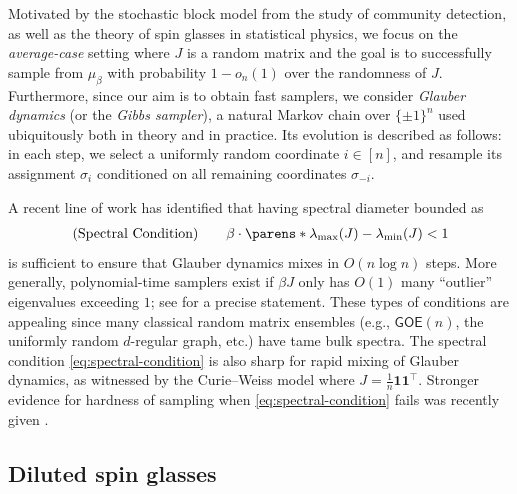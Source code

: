 \documentclass[11pt,letterpaper]{article}
\begin{document}
Motivated by the stochastic block model from the study of community detection, as well as the theory of spin glasses in statistical physics, we focus on the \emph{average-case} setting where $J$ is a random matrix and the goal is to successfully sample from $\mu_{\beta}$ with probability $1 - o_{n}(1)$ over the randomness of $J$. Furthermore, since our aim is to obtain fast samplers, we consider \emph{Glauber dynamics} (or the \emph{Gibbs sampler}), a natural Markov chain over $\{\pm1\}^{n}$ used ubiquitously both in theory and in practice. Its evolution is described as follows: in each step, we select a uniformly random coordinate $i \in [n]$, and resample its assignment $\sigma_{i}$ conditioned on all remaining coordinates $\sigma_{-i}$.

A recent line of work \cite{BB19, EKZ22, CE22, KLR22, BBD23, AJKPV24} has identified that having spectral diameter bounded as
\begin{align}\label{eq:spectral-condition}
    \text{(Spectral Condition)} \qquad \beta \cdot \parens*{\lambda_{\max}(J) - \lambda_{\min}(J)} < 1
\end{align}
is sufficient to ensure that Glauber dynamics mixes in $O(n\log n)$ steps. More generally, polynomial-time samplers exist if $\beta J$ only has $O(1)$ many ``outlier'' eigenvalues exceeding $1$; see \cite{KLR22} for a precise statement. These types of conditions are appealing since many classical random matrix ensembles (e.g., $\mathsf{GOE}(n)$, the uniformly random $d$-regular graph, etc.) have tame bulk spectra. The spectral condition \cref{eq:spectral-condition} is also sharp for rapid mixing of Glauber dynamics, as witnessed by the Curie--Weiss model where $J = \frac{1}{n}\mathbf{1}\mathbf{1}^{\top}$. Stronger evidence for hardness of sampling when \cref{eq:spectral-condition} fails was recently given \cite{Kun23}.

\subsection{Diluted spin glasses}
\end{document}
